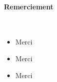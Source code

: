 \documentclass[10pt]{report}
\begin{document}
\vfill

\paragraph{\Huge Remerciement}

\

\vspace{3mm}

\begin{itemize}

\item Merci
\item Merci
\item Merci

\end{itemize}

\vfill






{\let\clearpage\relax }
\end{document}
